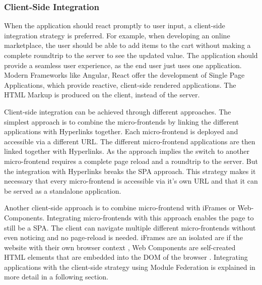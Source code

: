 \subsubsection{Client-Side Integration}

When the application should react promptly to user input, a client-side integration strategy is preferred. For example, when developing an online marketplace, the user should be able to add items to the cart without making a complete roundtrip to the server to see the updated value. The application should provide a seamless user experience, as the end user just uses one application. Modern Frameworks like Angular, React offer the development of Single Page Applications, which provide reactive, client-side rendered applications. The HTML Markup is produced on the client, instead of the server. \cite{book:2020:geers:background:micro-frontends:micro-frontends-in-action}

\bigskip

\noindent Client-side integration can be achieved through different approaches. The simplest approach is to combine the micro-frontends by linking the different applications with Hyperlinks together. Each micro-frontend is deployed and accessible via a different URL. The different micro-frontend applications are then linked together with Hyperlinks. As the approach implies the switch to another micro-frontend requires a complete page reload and a roundtrip to the server. But the integration with Hyperlinks breaks the SPA approach. This strategy makes it necessary that every micro-frontend is accessible via it's own URL and that it can be served as a standalone application.

\bigskip

\noindent Another client-side approach is to combine micro-frontend with iFrames or Web-Components. Integrating micro-frontends with this approach enables the page to still be a SPA. The client can navigate multiple different micro-frontends without even noticing and no page-reload is needed. iFrames are an isolated are if the website with their own browser context \cite[35]{book:2020:geers:background:micro-frontends:micro-frontends-in-action}, Web Components are self-created HTML elements that are embedded into the DOM of the browser \cite[103]{book:2019:farrell:background:micro-frontends:web-components-in-action}. Integrating applications with the client-side strategy using Module Federation is explained in more detail in a following section.
